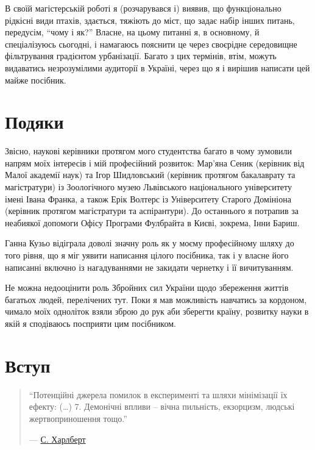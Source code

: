 \documentclass[
  11pt,
]{book}
\begin{document}
В своїй магістерській роботі я (розчарувався і) виявив, що функціонально рідкісні види птахів, здається, тяжіють до міст, що задає набір інших питань, передусім, ``чому і як?'' Власне, на цьому питанні я, в основному, й спеціалізуюсь сьогодні, і намагаюсь пояснити це через своєрідне середовищне фільтрування градієнтом урбанізації. Багато з цих термінів, втім, можуть видаватись незрозумілими аудиторії в Україні, через що я і вирішив написати цей майже посібник.

\chapter*{Подяки}\label{ux43fux43eux434ux44fux43aux438}

Звісно, наукові керівники протягом мого студентства багато в чому зумовили напрям моїх інтересів і мій професійний розвиток: Мар'яна Сеник (керівник від Малої академії наук) та Ігор Шидловський (керівник протягом бакалаврату та магістратури) із Зоологічного музею Львівського національного університету імені Івана Франка, а також Ерік Волтерс із Університету Старого Домініона (керівник протягом магістратури та аспірантури). До останнього я потрапив за неабиякої допомоги Офісу Програми Фулбрайта в Києві, зокрема, Інни Бариш.

Ганна Кузьо відіграла доволі значну роль як у моєму професійному шляху до того рівня, що я міг уявити написання цілого посібника, так і у власне його написанні включно із нагадуваннями не закидати чернетку і її вичитуванням.

Не можна недооцінити роль Збройних сил України щодо збереження життів багатьох людей, перелічених тут. Поки я мав можливість навчатись за кордоном, чимало моїх одноліток взяли зброю до рук аби зберегти країну, розвитку науки в якій я сподіваюсь посприяти цим посібником.

\chapter{Вступ}\label{introduction}

\begin{quote}
``Потенційні джерела помилок в експерименті та шляхи мінімізації їх ефекту:
(\ldots)
7. Демонічні впливи -- вічна пильність, екзорцизм, людські жертвоприношення тощо.''

--- \href{https://doi.org/10.2307/1942661}{С. Харлберт}
\end{quote}
\end{document}
